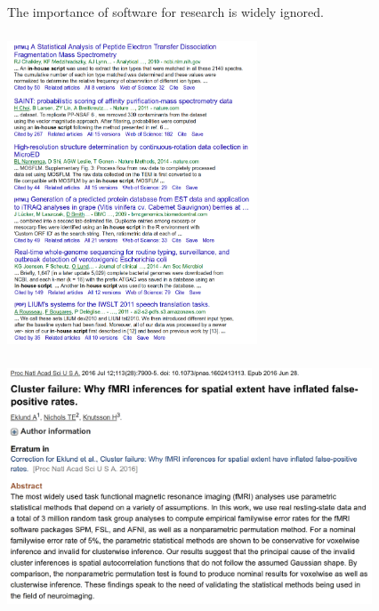 \documentclass{beamer}
\begin{document}
\begin{frame}
  \frametitle{}
  \begin{block}{}
    \begin{center}
      The importance of software for research is widely ignored.
      \end{center}
  \end{block}
\end{frame}

\begin{frame}
  \frametitle{}
  \begin{center}
    \includegraphics[height=9cm]{images/In-house_script.jpg}
  \end{center}
\end{frame}

\begin{frame}
  \frametitle{}
  \begin{center}
    \includegraphics[height=7cm]{images/fMRI_software_failure.png}
  \end{center}
\end{frame}
\end{document}
